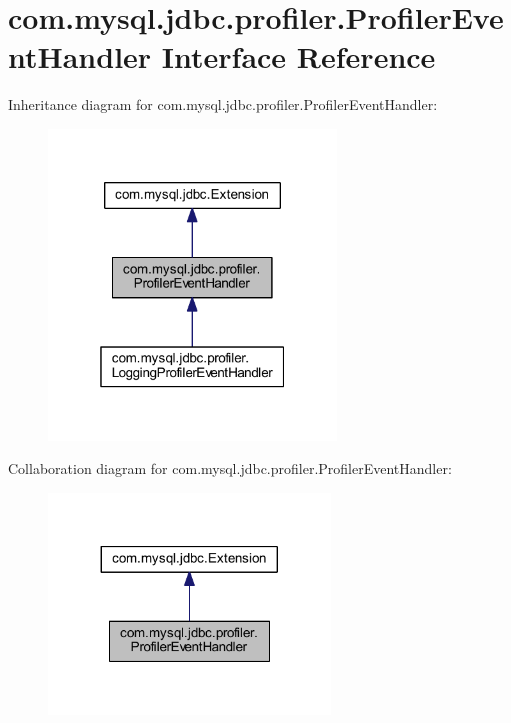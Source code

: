 \hypertarget{interfacecom_1_1mysql_1_1jdbc_1_1profiler_1_1_profiler_event_handler}{}\section{com.\+mysql.\+jdbc.\+profiler.\+Profiler\+Event\+Handler Interface Reference}
\label{interfacecom_1_1mysql_1_1jdbc_1_1profiler_1_1_profiler_event_handler}


Inheritance diagram for com.\+mysql.\+jdbc.\+profiler.\+Profiler\+Event\+Handler\+:
\nopagebreak
\begin{figure}[H]
\begin{center}
\leavevmode
\includegraphics[width=217pt]{interfacecom_1_1mysql_1_1jdbc_1_1profiler_1_1_profiler_event_handler__inherit__graph}
\end{center}
\end{figure}


Collaboration diagram for com.\+mysql.\+jdbc.\+profiler.\+Profiler\+Event\+Handler\+:
\nopagebreak
\begin{figure}[H]
\begin{center}
\leavevmode
\includegraphics[width=212pt]{interfacecom_1_1mysql_1_1jdbc_1_1profiler_1_1_profiler_event_handler__coll__graph}
\end{center}
\end{figure}

